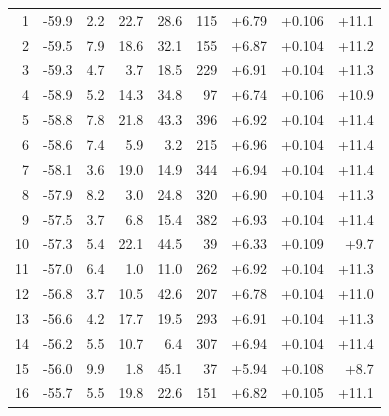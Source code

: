 \begin{longtable}{@{}r r r r r r r r r@{}}
1 & -59.9 & 2.2 & 22.7 & 28.6 & 115 & \cellcolor{green!69}+6.79 & \cellcolor{yellow!66}+0.106 & \cellcolor{orange!68}+11.1 \\
2 & -59.5 & 7.9 & 18.6 & 32.1 & 155 & \cellcolor{green!69}+6.87 & \cellcolor{yellow!65}+0.104 & \cellcolor{orange!69}+11.2 \\
3 & -59.3 & 4.7 & 3.7 & 18.5 & 229 & \cellcolor{green!70}+6.91 & \cellcolor{yellow!65}+0.104 & \cellcolor{orange!69}+11.3 \\
4 & -58.9 & 5.2 & 14.3 & 34.8 & 97 & \cellcolor{green!68}+6.74 & \cellcolor{yellow!66}+0.106 & \cellcolor{orange!68}+10.9 \\
5 & -58.8 & 7.8 & 21.8 & 43.3 & 396 & \cellcolor{green!70}+6.92 & \cellcolor{yellow!65}+0.104 & \cellcolor{orange!70}+11.4 \\
6 & -58.6 & 7.4 & 5.9 & 3.2 & 215 & \cellcolor{green!70}+6.96 & \cellcolor{yellow!65}+0.104 & \cellcolor{orange!70}+11.4 \\
7 & -58.1 & 3.6 & 19.0 & 14.9 & 344 & \cellcolor{green!70}+6.94 & \cellcolor{yellow!65}+0.104 & \cellcolor{orange!70}+11.4 \\
8 & -57.9 & 8.2 & 3.0 & 24.8 & 320 & \cellcolor{green!69}+6.90 & \cellcolor{yellow!65}+0.104 & \cellcolor{orange!69}+11.3 \\
9 & -57.5 & 3.7 & 6.8 & 15.4 & 382 & \cellcolor{green!70}+6.93 & \cellcolor{yellow!65}+0.104 & \cellcolor{orange!70}+11.4 \\
10 & -57.3 & 5.4 & 22.1 & 44.5 & 39 & \cellcolor{green!65}+6.33 & \cellcolor{yellow!67}+0.109 & \cellcolor{orange!62}+9.7 \\
11 & -57.0 & 6.4 & 1.0 & 11.0 & 262 & \cellcolor{green!70}+6.92 & \cellcolor{yellow!65}+0.104 & \cellcolor{orange!70}+11.3 \\
12 & -56.8 & 3.7 & 10.5 & 42.6 & 207 & \cellcolor{green!69}+6.78 & \cellcolor{yellow!65}+0.104 & \cellcolor{orange!68}+11.0 \\
13 & -56.6 & 4.2 & 17.7 & 19.5 & 293 & \cellcolor{green!70}+6.91 & \cellcolor{yellow!65}+0.104 & \cellcolor{orange!69}+11.3 \\
14 & -56.2 & 5.5 & 10.7 & 6.4 & 307 & \cellcolor{green!70}+6.94 & \cellcolor{yellow!65}+0.104 & \cellcolor{orange!70}+11.4 \\
15 & -56.0 & 9.9 & 1.8 & 45.1 & 37 & \cellcolor{green!62}+5.94 & \cellcolor{yellow!67}+0.108 & \cellcolor{orange!57}+8.7 \\
16 & -55.7 & 5.5 & 19.8 & 22.6 & 151 & \cellcolor{green!69}+6.82 & \cellcolor{yellow!66}+0.105 & \cellcolor{orange!68}+11.1 \\

\end{longtable}
